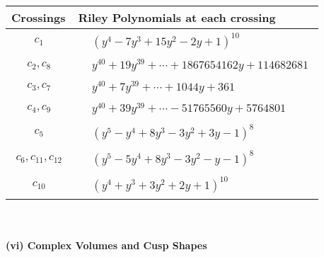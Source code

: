 \documentclass[1p]{elsarticle_modified}
\theoremstyle{definition}
\begin{document}
\begin{tabular}{m{50pt}|m{274pt}}
Crossings & \hspace{64pt}Riley Polynomials at each crossing \\
\hline $$\begin{aligned}c_{1}\end{aligned}$$&$\begin{aligned}
&(y^4-7 y^3+15 y^2-2 y+1)^{10}
\end{aligned}$\\
\hline $$\begin{aligned}c_{2},c_{8}\end{aligned}$$&$\begin{aligned}
&y^{40}+19 y^{39}+\cdots+1867654162 y+114682681
\end{aligned}$\\
\hline $$\begin{aligned}c_{3},c_{7}\end{aligned}$$&$\begin{aligned}
&y^{40}+7 y^{39}+\cdots+1044 y+361
\end{aligned}$\\
\hline $$\begin{aligned}c_{4},c_{9}\end{aligned}$$&$\begin{aligned}
&y^{40}+39 y^{39}+\cdots-51765560 y+5764801
\end{aligned}$\\
\hline $$\begin{aligned}c_{5}\end{aligned}$$&$\begin{aligned}
&(y^5- y^4+8 y^3-3 y^2+3 y-1)^8
\end{aligned}$\\
\hline $$\begin{aligned}c_{6},c_{11},c_{12}\end{aligned}$$&$\begin{aligned}
&(y^5-5 y^4+8 y^3-3 y^2- y-1)^8
\end{aligned}$\\
\hline $$\begin{aligned}c_{10}\end{aligned}$$&$\begin{aligned}
&(y^4+y^3+3 y^2+2 y+1)^{10}
\end{aligned}$\\
\hline
\end{tabular}\\~\\
\newpage\flushleft \textbf{(vi) Complex Volumes and Cusp Shapes}
\end{document}
